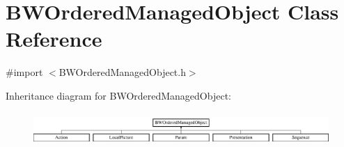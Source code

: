 \hypertarget{interface_b_w_ordered_managed_object}{
\section{BWOrderedManagedObject Class Reference}
\label{interface_b_w_ordered_managed_object}
}


{\ttfamily \#import $<$BWOrderedManagedObject.h$>$}

Inheritance diagram for BWOrderedManagedObject:\begin{figure}[H]
\begin{center}
\leavevmode
\includegraphics[height=1.265537cm]{interface_b_w_ordered_managed_object}
\end{center}
\end{figure}
